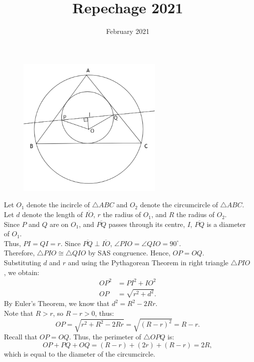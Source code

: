 \documentclass{article}
\title{Repechage 2021}
\date{February 2021}
\begin{document}
\begin{figure}[htp]
    \centering
    \includegraphics[width=200pt]{Q4_img}
    \label{fig:diagram}
\end{figure}

Let $O_1$ denote the incircle of $\triangle ABC$ and $O_2$ denote the circumcircle of $\triangle ABC$.\\
Let $d$ denote the length of $\overline{IO}$, $r$ the radius of $O_1$, and $R$ the radius of $O_2$. \\

Since $P$ and $Q$ are on $O_1$, and $\overline{PQ}$ passes through its centre, $I$, $\overline{PQ}$ is a diameter of $O_1$. \\
Thus, $PI = QI = r$. Since $\overline{PQ} \perp \overline{IO}$, $\angle PIO = \angle QIO = 90^{\circ}$. \\
Therefore, $\triangle PIO \cong \triangle QIO$ by SAS congruence. Hence, $OP = OQ$. \\

Substituting $d$ and $r$ and using the Pythagorean Theorem in right triangle $\triangle PIO$, we obtain:
\begin{align*}
    OP^2 &= PI^2 + IO^2 \\
    OP &= \sqrt{r^2 + d^2}.
\end{align*}
By Euler's Theorem, we know that $d^2 = R^2 - 2Rr$. \\
Note that $R>r$, so $R-r>0$, thus:
$$OP = \sqrt{r^2 + R^2 - 2Rr} = \sqrt{(R - r)^2} = R - r.$$
Recall that $OP = OQ$. Thus, the perimeter of $\triangle OPQ$ is:
$$OP + PQ + OQ = (R-r) + (2r) + (R-r) = 2R,$$
which is equal to the diameter of the circumcircle.
\end{document}
